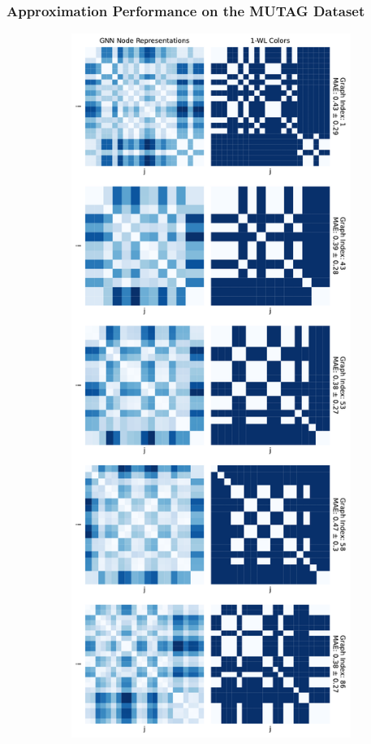 \subsubsection{Approximation Performance on the MUTAG Dataset}
\begin{figure}[H]
    \centering
    \begin{subfigure}[b]{0.45992852703\textwidth}
        \centering
        \includegraphics[width=\textwidth, left]{Figures/heatmaps_MUTAG_0.pdf}

\end{subfigure}
\end{figure}
